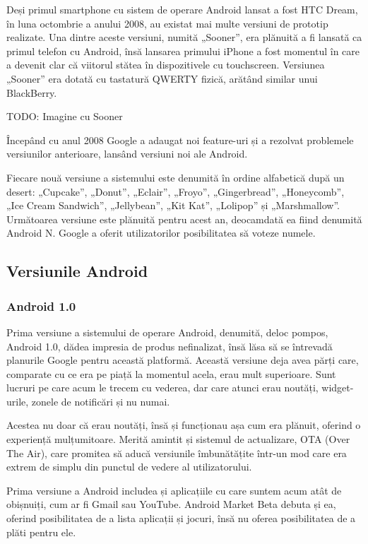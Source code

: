 \documentclass[12pt,a4paper]{article}
\begin{document}
Deși primul smartphone cu sistem de operare Android lansat a fost HTC Dream, în luna octombrie a anului 2008, au existat mai multe versiuni de prototip realizate. Una dintre aceste versiuni, numită „Sooner”, era plănuită a fi lansată ca primul telefon cu Android, însă lansarea primului iPhone a fost momentul în care a devenit clar că viitorul stătea în dispozitivele cu touchscreen. Versiunea „Sooner” era dotată cu tastatură QWERTY fizică, arătând similar unui BlackBerry.

TODO: Imagine cu Sooner

Începând cu anul 2008 Google a adaugat noi feature-uri și a rezolvat problemele versiunilor anterioare, lansând versiuni noi ale Android.

Fiecare nouă versiune a sistemului este denumită în ordine alfabetică după un desert: „Cupcake”, „Donut”, „Eclair”, „Froyo”, „Gingerbread”, „Honeycomb”, „Ice Cream Sandwich”, „Jellybean”, „Kit Kat”, „Lolipop” și „Marshmallow”. Următoarea versiune este plănuită pentru acest an, deocamdată ea fiind denumită Android N. Google a oferit utilizatorilor posibilitatea să voteze numele.


\subsection{Versiunile Android}
\subsubsection{Android 1.0}
Prima versiune a sistemului de operare Android, denumită, deloc pompos, Android 1.0, dădea impresia de produs nefinalizat, însă lăsa să se întrevadă planurile Google pentru această platformă. Această versiune deja avea părți care, comparate cu ce era  pe piață la momentul acela, erau mult superioare. Sunt lucruri pe care acum le trecem cu vederea, dar care atunci erau noutăți, widget-urile, zonele de notificări și nu numai. 

Acestea nu doar că erau noutăți, însă și funcționau așa cum era plănuit, oferind o experiență mulțumitoare. Merită amintit și sistemul de actualizare, OTA (Over The Air), care promitea să aducă versiunile îmbunătățite într-un mod care era extrem de simplu din punctul de vedere al utilizatorului.

Prima versiune a Android includea și aplicațiile cu care suntem acum atât de obișnuiți, cum ar fi Gmail sau YouTube. Android Market Beta debuta și ea, oferind posibilitatea de a lista aplicații și jocuri, însă nu oferea posibilitatea de a plăti pentru ele.
\end{document}
